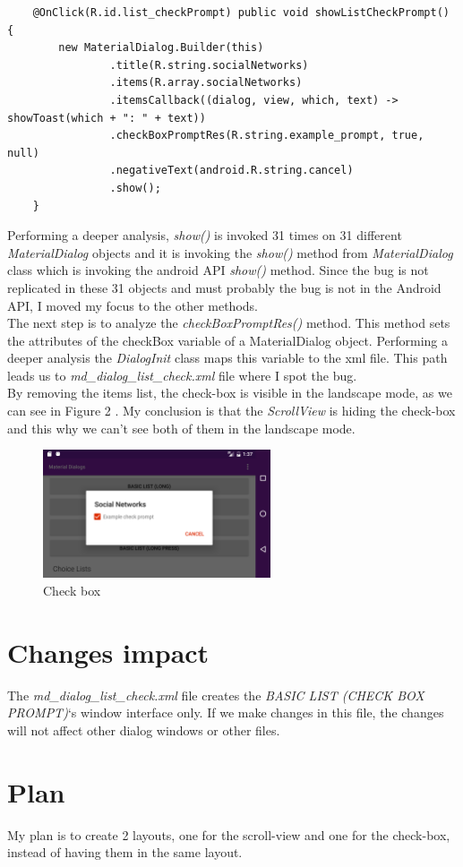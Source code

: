 \documentclass[12pt]{report}
\begin{document}
	\begin{lstlisting}
    @OnClick(R.id.list_checkPrompt) public void showListCheckPrompt() {
        new MaterialDialog.Builder(this)
                .title(R.string.socialNetworks)
                .items(R.array.socialNetworks)
                .itemsCallback((dialog, view, which, text) -> showToast(which + ": " + text))
                .checkBoxPromptRes(R.string.example_prompt, true, null)
                .negativeText(android.R.string.cancel)
                .show();
    }
\end{lstlisting}
\noindent
  Performing a deeper analysis, \emph{show()} is invoked 31 times on 31 different \emph{MaterialDialog} objects and it is invoking the \emph{show()} method from \emph{MaterialDialog} class which is invoking the android API \emph{show()} method. Since the bug is not replicated in these 31 objects and must probably the bug is not in the Android API, I moved my focus to the other methods.\\
  The next step is to analyze the \emph{checkBoxPromptRes()} method. This method sets the attributes of the checkBox variable of a MaterialDialog object. Performing a deeper analysis the \emph{DialogInit} class maps this variable to the xml file. This path leads us to \emph{md\_dialog\_list\_check.xml} file where I spot the bug.\\
  By removing the items list, the check-box is visible in the landscape mode, as we can see in Figure 2 . My conclusion is that the \emph{ScrollView} is hiding the check-box and this why we can't see both of them in the landscape mode.
  \begin{figure}[H]
  \centering
  \includegraphics[width=0.6\textwidth]{screenshots/checkbox.png}
  \caption{Check box}
\end{figure}

\section*{Changes impact}
The \emph{md\_dialog\_list\_check.xml} file creates the \emph{BASIC LIST (CHECK BOX PROMPT)}`s window interface only. If we make changes in this file, the changes will not affect other dialog windows or other files.
 

\section*{Plan}
My plan is to create 2 layouts, one for the scroll-view and one for the check-box, instead of having them in the same layout.
\end{document}
